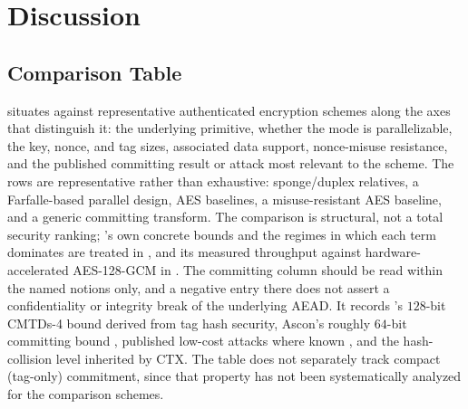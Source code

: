 \section{Discussion}
\label{sec:discussion}

\subsection{Comparison Table}
\label{sec:compare-table}

 situates \TW{} against representative authenticated
encryption schemes along the axes that distinguish it: the underlying primitive,
whether the mode is parallelizable, the key, nonce, and tag sizes, associated data
support, nonce-misuse resistance, and the published committing result or attack
most relevant to the scheme. The rows are representative rather than
exhaustive: sponge/duplex relatives, a Farfalle-based parallel design, AES
baselines, a misuse-resistant AES baseline, and a generic committing transform.
The comparison is structural, not a total security ranking; \TW{}'s own
concrete bounds and the regimes in which each term dominates are treated in
, and its measured throughput against
hardware-accelerated AES-128-GCM in . The committing
column should be read within the named notions only, and a negative entry there
does not assert a confidentiality or integrity break of the underlying AEAD. It
records \TW{}'s $128$-bit \textsf{CMTDs-4} bound derived from tag hash
security, Ascon's roughly $64$-bit committing bound \cite{KSW23}, published
low-cost attacks where known \cite{KSW23,CR22,ADGKLS22}, and the
hash-collision level inherited by \textsf{CTX}.
The table does not separately track compact (tag-only) commitment, since
that property has not been systematically analyzed for the comparison
schemes.

